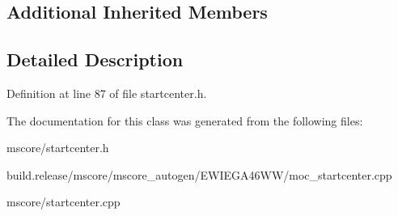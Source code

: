 \subsection*{Additional Inherited Members}


\subsection{Detailed Description}


Definition at line 87 of file startcenter.\+h.



The documentation for this class was generated from the following files\+:\begin{DoxyCompactItemize}
\item 
mscore/startcenter.\+h\item 
build.\+release/mscore/mscore\+\_\+autogen/\+E\+W\+I\+E\+G\+A46\+W\+W/moc\+\_\+startcenter.\+cpp\item 
mscore/startcenter.\+cpp\end{DoxyCompactItemize}
